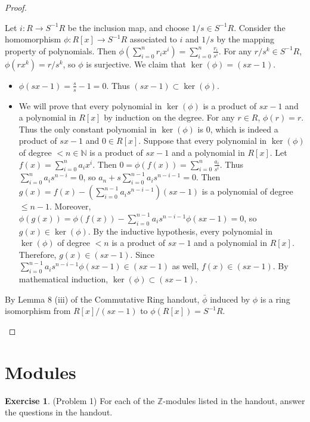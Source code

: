 \documentclass[12pt, psamsfonts]{amsart}
\theoremstyle{definition}
\newtheorem*{exer}{Exercise}
\theoremstyle{remark}
\numberwithin{equation}{section}
\begin{document}
\begin{proof}
\begin{itemize}
      Let $i: R \rightarrow S^{-1}R$ be the inclusion map, and choose $1/s \in S^{-1}R$.
      Consider the homomorphism $\phi: R[x] \rightarrow S^{-1}R$ associated to $i$ and $1/s$ by the mapping property of polynomials.
      Then $\phi(\sum_{i=0}^n r_ix^i) = \sum_{i=0}^n \frac{r_i}{s^i}$.
      For any $r/s^k \in S^{-1}R$, $\phi(rx^k) = r/s^k$, so $\phi$ is surjective.
      We claim that $\ker(\phi) = (sx - 1)$.
      \begin{itemize}
        \item
          $\phi(sx - 1) = \frac{s}{s} - 1 = 0$.
          Thus $(sx - 1) \subset \ker(\phi)$.
        \item
          We will prove that every polynomial in $\ker(\phi)$ is a product of $sx - 1$ and a polynomial in $R[x]$ by induction on the degree.
          For any $r \in R$, $\phi(r) = r$.
          Thus the only constant polynomial in $\ker(\phi)$ is 0, which is indeed a product of $sx - 1$ and $0 \in R[x]$.
          Suppose that every polynomial in $\ker(\phi)$ of degree $< n \in \mathbb{N}$ is a product of $sx - 1$ and a polynomial in $R[x]$.
          Let $f(x) = \sum_{i=0}^{n} a_ix^i$.
          Then $0 = \phi(f(x)) = \sum_{i=0}^n \frac{a_i}{s^i}$.
          Thus $\sum_{i=0}^{n} a_is^{n - i} = 0$, so $a_n + s\sum_{i=0}^{n - 1} a_is^{n - i - 1} = 0$.
          Then $g(x) = f(x) - (\sum_{i=0}^{n - 1}a_is^{n - i - 1})(sx - 1)$ is a polynomial of degree $\leq n - 1$.
          Moreover, $\phi(g(x)) = \phi(f(x)) - \sum_{i=0}^{n - 1}a_is^{n - i - 1}\phi(sx - 1) = 0$, so $g(x) \in \ker(\phi)$.
          By the inductive hypothesis, every polynomial in $\ker(\phi)$ of degree $< n$ is a product of $sx - 1$ and a polynomial in $R[x]$.
          Therefore, $g(x) \in (sx - 1)$.
          Since $\sum_{i=0}^{n - 1}a_is^{n - i - 1}\phi(sx - 1) \in (sx - 1)$ as well, $f(x) \in (sx - 1)$.
          By mathematical induction, $\ker(\phi) \subset (sx - 1)$.
      \end{itemize}

      By Lemma 8 (iii) of the Commutative Ring handout, $\bar{\phi}$ induced by $\phi$ is a ring isomorphism from $R[x]/(sx - 1)$ to $\phi(R[x]) = S^{-1}R$.
  \end{itemize}
\end{proof}

\section{Modules}

\begin{exer}{(Problem 1)}
  For each of the $\mathbb{Z}$-modules listed in the handout, answer the questions in the handout.
\end{exer}
\end{document}
